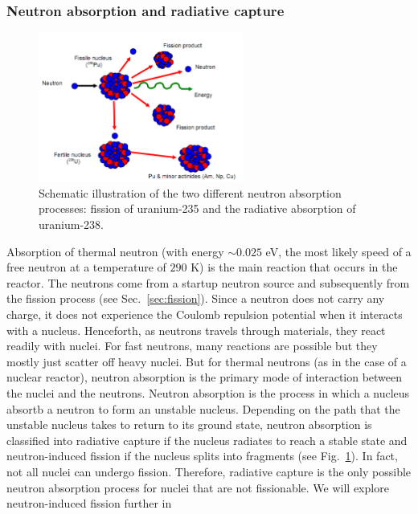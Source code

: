 \documentclass[nofootinbib,preprint,aps]{revtex4-1}
\begin{document}
    \subsubsection{Neutron absorption and radiative capture}
    \label{sec:capture}
        \begin{figure}[h]
            \centering
            \includegraphics[width=0.6\textwidth]{pu.png}
            \caption{Schematic illustration of the two different neutron absorption processes:
            fission of uranium-235 and the radiative absorption of uranium-238.}
            \label{fig:both}
        \end{figure}
    Absorption of thermal neutron (with energy $\sim 0.025$ eV, the most likely speed of a free neutron at 
    a temperature of $290$ K) is the main reaction that
    occurs in the reactor. The neutrons come from a startup neutron source and subsequently from the fission
    process (see Sec.~\ref{sec:fission}).
    Since a neutron does not carry any charge, it does not experience the Coulomb repulsion potential when
    it interacts
    with a nucleus.
    Henceforth, as neutrons travels through materials, they react readily with nuclei.
    For fast neutrons, many reactions are possible but they mostly just scatter off heavy nuclei.
    But for thermal neutrons (as in the case of a nuclear reactor), neutron absorption
    is the primary mode of interaction between the nuclei and the neutrons.
    Neutron absorption is the process in which a nucleus absortb a neutron to form an unstable
    nucleus.
    Depending on the path that the unstable nucleus takes to return to its ground
    state, neutron absorption is classified into radiative capture if the nucleus radiates to reach a stable
    state and neutron-induced fission if the nucleus splits into fragments (see Fig.~\ref{fig:both}).
    In fact, not all nuclei can undergo fission.
    Therefore, radiative capture is the only possible neutron absorption process for
    nuclei that are not fissionable.\cite{lb01} We will explore neutron-induced fission further in
\end{document}

